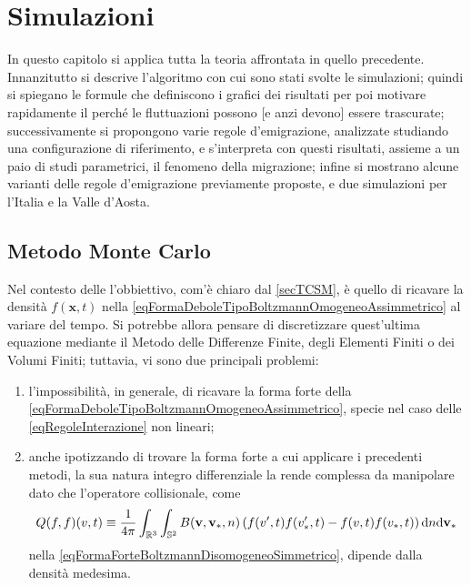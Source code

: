 

\chapter{Simulazioni}\label{secSimulazioni}

  In questo capitolo si applica tutta la teoria affrontata in quello precedente. Innanzitutto si descrive l'algoritmo con cui sono stati svolte le simulazioni; quindi si spiegano le formule che definiscono i grafici dei risultati per poi motivare rapidamente il perché le fluttuazioni possono [e anzi devono] essere trascurate; successivamente si propongono varie regole d'emigrazione, analizzate studiando una configurazione di riferimento, e s'interpreta con questi risultati, assieme a un paio di studi parametrici, il fenomeno della migrazione; infine si mostrano alcune varianti delle regole d'emigrazione previamente proposte, e due simulazioni per l'Italia e la Valle d'Aosta.

  \section{Metodo Monte Carlo}\label{secMetodoMonteCarlo}

    Nel contesto delle \TCSMA{} l'obbiettivo, com'è chiaro dal \cref{secTCSM}, è quello di ricavare la densità \(f(\mathbf x,t)\) nella \ref{eqFormaDeboleTipoBoltzmannOmogeneoAssimmetrico} al variare del tempo. Si potrebbe allora pensare di discretizzare quest'ultima equazione mediante il Metodo delle Differenze Finite, degli Elementi Finiti o dei Volumi Finiti; tuttavia, vi sono due principali problemi:
    
    \begin{enumerate}[
      label=\arabic*.,
    ]
      \item l'impossibilità, in generale, di ricavare la forma forte della \ref{eqFormaDeboleTipoBoltzmannOmogeneoAssimmetrico}, specie nel caso delle \ref{eqRegoleInterazione} non lineari;
      \item anche ipotizzando di trovare la forma forte a cui applicare i precedenti metodi, la sua natura integro differenziale la rende complessa da manipolare dato che l'operatore collisionale\footnotemark{}, come%
      \[
        Q(f,f)(v,t)\equiv
        \frac1{4\pi}\int_{\mathbb R^3}\int_{\mathbb S^2}
        B(\mathbf v,\mathbf v_*,n)
        \left(f(v',t)f(v'_*,t)-f(v,t)f(v_*,t)\right)
        \mathrm{d} n\mathrm{d}\mathbf v_*
      \]
      nella \cref{eqFormaForteBoltzmannDisomogeneoSimmetrico}, dipende dalla densità medesima.
    \end{enumerate}

